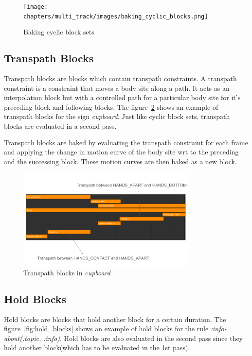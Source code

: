 \documentclass[../../main.tex]{subfiles}
\begin{document}
\begin{figure}
    \centering
    \texttt{[image: chapters/multi\_track/images/baking\_cyclic\_blocks.png]}
    \caption{Baking cyclic block sets}
    \label{fig:baking_cyclic_blocks}
\end{figure}

\subsection{Transpath Blocks}
\label{ch:multi_track:second_pass:transpath_blocks}

Transpath blocks are blocks which contain transpath constraints. A transpath constraint is a constraint that moves a body site along a path. It acts as an interpolation block but with a controlled path for a particular body site for it's preceding block and following blocks. The figure~\ref{fig:transpath_blocks} shows an example of transpath blocks for the sign \emph{cupboard}. Just like cyclic block sets, transpath blocks are evaluated in a second pass.

Transpath blocks are baked by evaluating the transpath constraint for each frame and applying the change in motion curve of the body site wrt to the preceding and the successing block. These motion curves are then baked as a new block.

\begin{figure}[h]
    \centering
    \includegraphics[width=0.8\textwidth]{chapters/multi_track/images/transpath_blocks.png}
    \caption{Transpath blocks in \emph{cupboard}}
    \label{fig:transpath_blocks}
\end{figure}

\subsection{Hold Blocks}
\label{ch:multi_track:second_pass:hold_blocks}

Hold blocks are blocks that hold another block for a certain duration. The figure~\ref{fig:hold_blocks} shows an example of hold blocks for the rule \emph{:info-about(:topic, :info)}. Hold blocks are also evaluated in the second pass since they hold another block(which has to be evaluated in the 1st pass).
\end{document}
